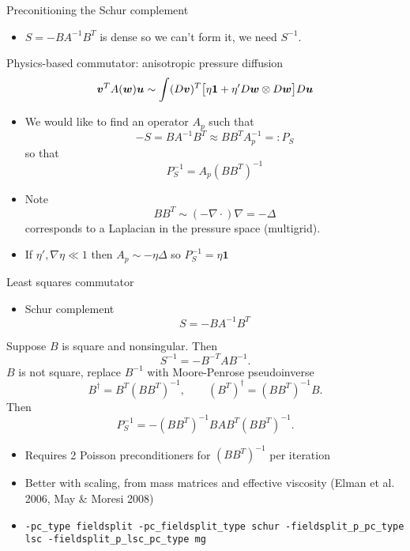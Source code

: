 \begin{frame}[shrink=5]{Preconitioning the Schur complement}
  \begin{itemize}\item $S = -BA^{-1}B^T$ is dense so we can't form it, we need
    $S^{-1}$.\end{itemize}
  \begin{block}{Physics-based commutator: anisotropic pressure diffusion}
    \[ \bm v^T A(\bm w) \bm u \sim \int (D\bm v)^T \big[\eta\bm 1 + \eta' D\bm w \otimes D\bm w\big] D\bm u \]
    \begin{itemize}
    \item We would like to find an operator $A_p$ such that
    \[ -S = B A^{-1} B^T \approx BB^T A_p^{-1} =: P_S \]
    so that
    \[ P_S^{-1} = A_p (BB^T)^{-1} \]
    \item Note
      \[ BB^T \sim (-\nabla \cdot)\nabla = - \Delta \]
      corresponds to a Laplacian in the pressure space (multigrid).
    \item If $\eta',\nabla \eta \ll 1$ then $A_p \sim -\eta \Delta$ so $P_S^{-1} = \eta \bm 1$
    \end{itemize}
  \end{block}
\end{frame}

\begin{frame}[shrink=5]{Least squares commutator}
  \begin{itemize}\item Schur complement \[ S = - B A^{-1} B^T \] \end{itemize}
  Suppose $B$ is square and nonsingular.  Then
  \[ S^{-1} = -B^{-T} A B^{-1} . \]
  $B$ is not square, replace $B^{-1}$ with Moore-Penrose pseudoinverse
  \[ B^{\dagger} = B^T(BB^T)^{-1}, \qquad (B^T)^\dagger = (BB^T)^{-1}B .\]  Then
  \[ P_S^{-1} = - (BB^T)^{-1} BAB^T (BB^T)^{-1} . \]
  \vspace{-1em}
  \begin{itemize}
  \item Requires 2 Poisson preconditioners for $(BB^T)^{-1}$ per iteration
  \item Better with scaling, from mass matrices and effective viscosity (Elman et al. 2006, May \& Moresi 2008)
  \item \texttt{-pc\_type fieldsplit -pc\_fieldsplit\_type schur -fieldsplit\_p\_pc\_type lsc -fieldsplit\_p\_lsc\_pc\_type mg}
  \end{itemize}
\end{frame}
